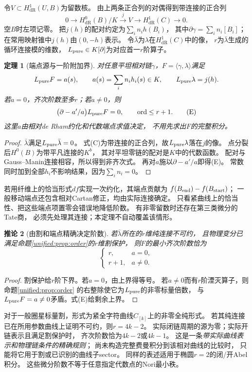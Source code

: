 \documentclass[11pt,a4paper,oneside]{ctexart}
\theoremstyle{cnplain}
\newtheorem{theorem}{定理}[section]
\newtheorem{corollary}[theorem]{推论}
\theoremstyle{definition}
\theoremstyle{remark}
\newcommand{\dR}{\mathrm{dR}}
\numberwithin{equation}{section}
\begin{document}
令$V\subset H^1_{\dR}(U,B)$为留数核。
由上两条正合列的对偶得到带连接的正合列
\[
 0\longrightarrow H^0_{\dR}(B)/K
 \xrightarrow{j}V\longrightarrow H^1_{\dR}(C)\longrightarrow0.
 \tag{C}
\]
空$B$时左项记零。
把$j(h)$的配对约定为$\sum_i n_i h(B_i)$，
其中$\partial\gamma=\sum_i n_i[B_i]$；在常用映射锥中$j(h)$由$(0,-h)$表示。
令$\bar\lambda$为$\lambda$在$H^1_{\dR}(C)$中的像，
$r$为$\bar\lambda$生成的循环连接模的维数，
$L_{\rm pure}\in K[\partial]$为对应首一$r$阶算子。

\begin{theorem}[端点源与一阶附加界]\label{unified:thm:endpoint}
对任意平坦相对链$\gamma$，$F=\langle\gamma,\lambda\rangle$满足
\[
 L_{\rm pure}F=a(s),\qquad
 a(s)=\sum_i n_i h_i(s)\in K,\qquad
 L_{\rm pure}\lambda=j(h).
\]
若$a=0$，齐次阶数至多$r$；若$a\ne0$，则
\[
 \bigl(\partial-a'/a\bigr)L_{\rm pure}F=0,
 \qquad \operatorname{ord}\le r+1.
 \tag{E}
\]
这里$a$由相对de Rham约化和代数端点求值决定，
不用先求出$F$的完整积分。
\end{theorem}
\begin{proof}
$\bar\lambda$满足$L_{\rm pure}\bar\lambda=0$。
式(C)为带连接的正合列，故$L_{\rm pure}\lambda$落在$j$的像。
点分裂后$H^0(B)$为带平凡连接的$K^b$，
其对平坦零链的配对是$K$中的代数函数。
配对与Gauss--Manin连接相容，所以得到非齐次式。
再对$a$施以$\partial-a'/a$即得(E)。
常数同时加到全部$h_i$不影响结果，因为$\sum_i n_i=0$。
\end{proof}
若用纤维上的恰当形式$df$实现一次约化，其端点贡献为
$f(B_{\rm end})-f(B_{\rm start})$；
一般移动端点还包含相对Cartan修正，均由实际连接确定。
只看紧曲线上的恰当性、把这些端点项置零会错误地降低阶数。
有非零留数时还存在第三类微分的Tate商，
必须先处理其连接；本定理不自动覆盖该情形。

\begin{corollary}[由割和端点精确决定阶数]\label{unified:cor:exact-order}
若$\bar\lambda$所在的$r$维纯连接不可约，
且物理变分已满足命题\ref{unified:prop:order}的$r$维割保护，
则$F$的最小齐次阶数恰为
\[
 \begin{cases}
 r,&a=0,\\
 r+1,&a\ne0.
 \end{cases}
\]
\end{corollary}
\begin{proof}
割保护给$r$阶下界。若$a=0$，由上界得等号。
若$a\ne0$而有$r$阶湮灭算子，则命题\ref{unified:prop:order}
的右整除使它为$L_{\rm pure}$的非零标量倍数，
与$L_{\rm pure}F=a\ne0$矛盾。式(E)给剩余上界。
\end{proof}
对于一般圈星标量割，形式为紧全字符曲线$C_{[k]}$上的非零全纯形式。
若其纯连接已在所用参数曲线上证明不可约，则$r=4k-2$。
实际闭链周期的源为零；实际开链表示且满足割保护时，
齐次阶数恰为$4k-2$或$4k-1$。
这是一条\emph{带实际曲线表示和物理链条件的精确规则}；
尚未构造完整费曼积分到该相对曲线的比较时，
只能将它用于割或已识别的曲线子sector。
同样的表述适用于椭圆$r=2$的闭/开Abel积分。
这些微分阶数不等于任意指定代数点的Nori最小秩。
\end{document}
